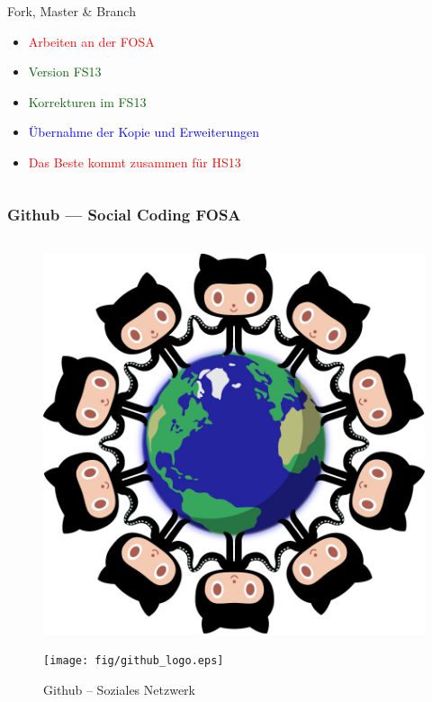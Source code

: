 \begin{frame}
\begin{columns}
\begin{column}{5cm}
\begin{block}{Fork, Master \& Branch}
\begin{itemize}
					\item \textcolor{red}{Arbeiten an der FOSA}
					\item \textcolor{darkgreen}{Version FS13}
					\item \textcolor{darkgreen}{Korrekturen im FS13}
					\item \textcolor{blue}{Übernahme der Kopie und Erweiterungen}
		                        \item \textcolor{red}{Das Beste kommt zusammen für HS13}
				\end{itemize}
			\end{block}
		\end{column}
	\end{columns}
\end{frame}


\begin{frame}
	\frametitle{Github --- Social Coding \hfill{} \footnotesize{FOSA}}
	\begin{columns}
	        \begin{column}{5cm}
			\begin{figure}
				\centering
				\includegraphics[scale=0.08]{fig/github_network.jpg}
			\end{figure}
				\vfill{}
			\begin{figure}
				\centering
				\texttt{[image: fig/github\_logo.eps]}
				\caption{Github -- Soziales Netzwerk}

\end{figure}
\end{column}
\end{columns}
\end{frame}
